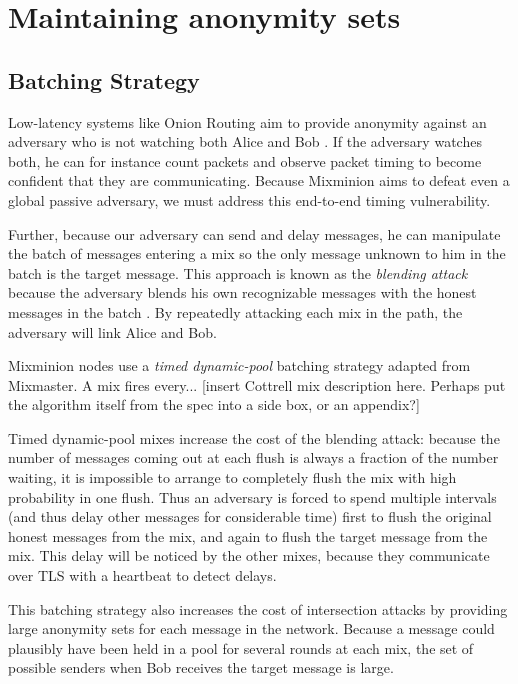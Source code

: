\documentclass[11pt]{IEEEtran}
\begin{document}

\section{Maintaining anonymity sets}
\label{sec:maintaining-anonymity}

\subsection{Batching Strategy}
\label{subsec:batching}

Low-latency systems like Onion Routing aim to provide anonymity against an
adversary who is not watching both Alice and Bob \cite{onion-routing}. If
the adversary watches both, he can for instance count packets and observe
packet timing to become confident that they are communicating. Because
Mixminion aims to defeat even a global passive adversary, we must address
this end-to-end timing vulnerability.

Further, because our adversary can send and delay messages,
he can manipulate the batch of messages entering a mix so the only message
unknown to him in the batch is the target message. This approach is
known as the \emph{blending attack} because the adversary blends his
own recognizable messages with the honest messages in the batch
\cite{batching-taxonomy}. By repeatedly
attacking each mix in the path, the adversary will link Alice and Bob.

Mixminion nodes use a \emph{timed dynamic-pool} batching strategy
\cite{batching-taxonomy} adapted from Mixmaster. A
mix fires every... [insert Cottrell mix description here. Perhaps put
the algorithm itself from the spec into a side box, or an appendix?]

Timed dynamic-pool mixes increase
the cost of the blending attack: because the number of messages coming
out at each flush is always a fraction of the number waiting, it is
impossible to arrange to completely flush the mix with high probability
in one flush. Thus an adversary is forced to spend multiple intervals
(and thus delay other messages for considerable time) first to flush
the original honest messages from the mix, and again to flush the
target message from the mix. This delay will be noticed by the other
mixes, because they communicate over TLS with a heartbeat to detect
delays.

This batching strategy also increases the cost of intersection attacks by
providing large anonymity sets for each message in the network. Because
a message could plausibly have been held in a pool for several rounds
at each mix, the set of possible senders when Bob receives the target
message is large.
\end{document}
